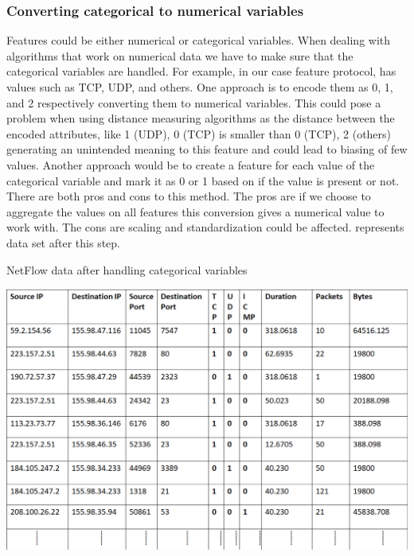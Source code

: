 \subsubsection{Converting categorical to numerical variables} 

Features could be either numerical or categorical variables. When dealing with algorithms that work on numerical data we have to make sure that the categorical variables are handled.
For example, in our case feature protocol, has values such as TCP, UDP, and others. One approach is to encode them as 0, 1, and 2 respectively converting them to numerical variables. This could pose a problem when using distance measuring algorithms as the distance between the encoded attributes, like 1 (UDP), 0 (TCP) is smaller than 0 (TCP), 2 (others) generating an unintended meaning to this feature and could lead to biasing of few values. Another approach would be to create a feature for each value of the categorical variable and mark it as 0 or 1 based on if the value is present or not. There are both pros and cons to this method. The pros are if we choose to aggregate the values on all features this conversion gives a numerical value to work with. The cons are scaling and standardization could be affected.  represents data set after this step.

\begin{table}[t]
	\caption{NetFlow data after handling categorical variables}%
	\centerline{\includegraphics[scale = 0.6]{categorical.png}}
\end{table}

